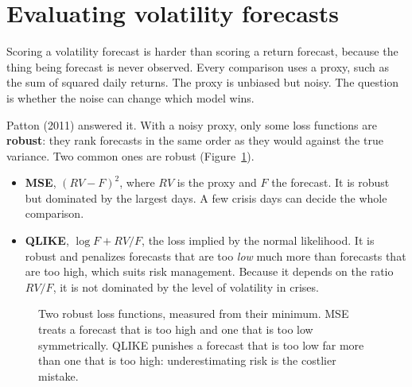 \section{Evaluating volatility forecasts}
\label{sec:11-eval}

Scoring a volatility forecast is harder than scoring a return forecast, because the thing being forecast is never observed. Every comparison uses a proxy, such as the sum of squared daily returns. The proxy is unbiased but noisy. The question is whether the noise can change which model wins.

Patton (2011) answered it. With a noisy proxy, only some loss functions are \textbf{robust}: they rank forecasts in the same order as they would against the true variance. Two common ones are robust (Figure~\ref{fig:11-qlike}).

\begin{itemize}
  \item \textbf{MSE}, $(RV - F)^2$, where $RV$ is the proxy and $F$ the forecast. It is robust but dominated by the largest days. A few crisis days can decide the whole comparison.
  \item \textbf{QLIKE}, $\log F + RV/F$, the loss implied by the normal likelihood. It is robust and penalizes forecasts that are too \emph{low} much more than forecasts that are too high, which suits risk management. Because it depends on the ratio $RV/F$, it is not dominated by the level of volatility in crises.
\end{itemize}

\begin{figure}[htbp]
\centering
{}
\caption{Two robust loss functions, measured from their minimum. MSE treats a forecast that is too high and one that is too low symmetrically. QLIKE punishes a forecast that is too low far more than one that is too high: underestimating risk is the costlier mistake.}
\label{fig:11-qlike}
\end{figure}

